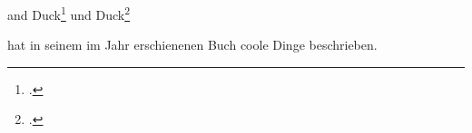 \documentclass[12pt,ngerman]{scrartcl}
\begin{document}
\blindtext \cite{Salerno2005} and Duck\footcite{Marques2005} und  Duck\footcite{Marques2005}  

\blindtext \citeauthor{Knuth1984} hat in seinem im Jahr \citeyear{Knuth1984} erschienenen Buch  coole Dinge beschrieben.

\citeauthor{Marques2005}


\nocite{*}

\printbibliography


\printbibliography[title={Coole Artikel}, type=article]

\printbibliography[title={Coole Bücher }, type=book]
\end{document}
